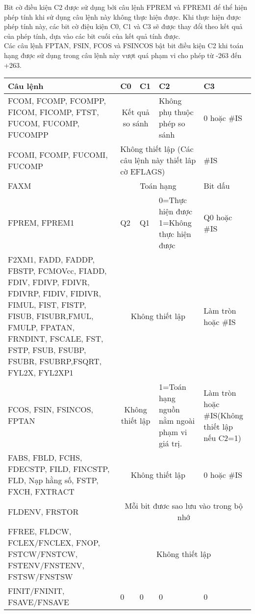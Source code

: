 	Bit cờ điều kiện C2 được sử dụng bởi câu lệnh FPREM và FPREM1 để thể hiện phép tính khi sử dụng câu lệnh này không thực hiện được. Khi thực hiện được phép tính này, các bit cờ điệu kiện C0, C1 và C3 sẽ được thay đổi theo kết quả của phép tính, dựa vào các bit cuối của kết quả tính được. \\

	Các câu lệnh FPTAN, FSIN, FCOS và FSINCOS bật bit điều kiện C2 khi toán hạng được sử dụng trong câu lệnh này vượt quá phạm vi cho phép từ -263 đến +263. 
	
		\begin{longtable}{ | m{5cm} | m{2cm} |  m{2cm} | m{3cm} | m{2cm}| }
			\hline
				Câu lệnh &  C0 & C1 & C2& C3\\
			\hline
			\hline
				FCOM, FCOMP, FCOMPP, FICOM, FICOMP, FTST, FUCOM, FUCOMP, FUCOMPP & \multicolumn{2}{c|}{Kết quả so sánh} & Không phụ thuộc phép so sánh & 0 hoặc \#IS \\
			\hline
				FCOMI, FCOMP, FUCOMI, FUCOMP	 & \multicolumn{3}{p{7cm}|}{Không thiết lập (Các câu lệnh này thiết lâp cờ EFLAGS) } & \#IS \\
				\hline 
				FAXM & \multicolumn{3}{c|}{Toán hạng} & Bit dấu\\
				\hline 
				FPREM, FPREM1 & Q2 & Q1 & 0=Thực hiện được 1=Không thực hiện được & Q0 hoặc \#IS \\
				\hline
				F2XM1, FADD, FADDP, 	FBSTP, FCMOVcc, FIADD, FDIV, FDIVP, FDIVR, FDIVRP, FIDIV, FIDIVR,	FIMUL, FIST, FISTP, FISUB, FISUBR,FMUL, FMULP, FPATAN, FRNDINT, FSCALE, FST, FSTP, FSUB, FSUBP, FSUBR, FSUBRP,FSQRT, FYL2X, FYL2XP1 & \multicolumn{3}{c|}{Không thiết lập} & Làm tròn hoặc \#IS \\
				\hline
				FCOS, FSIN, FSINCOS, FPTAN & \multicolumn{2}{c|}{Không thiết lập} & 1=Toán hạng nguồn nằm ngoài phạm vi giá trị. & Làm tròn hoặc \#IS(Không thiết lập nếu C2=1) \\
				\hline
				FABS, FBLD, FCHS, FDECSTP, FILD, FINCSTP, FLD, Nạp hằng số, FSTP, FXCH, FXTRACT & \multicolumn{3}{c|}{Không thiết lập} & 0 hoặc \#IS \\
				\hline
				FLDENV, FRSTOR & \multicolumn{4}{c|}{Mỗi bit đươc sao lưu vào trong bộ nhớ}\\
				\hline
				FFREE, FLDCW, FCLEX/FNCLEX, FNOP, FSTCW/FNSTCW, FSTENV/FNSTENV, FSTSW/FNSTSW & \multicolumn{4}{c|}{Không thiết lập}\\
				\hline
				FINIT/FNINIT, FSAVE/FNSAVE & 0 & 0 &0 & 0\\
			\hline
		\end{longtable}	
			
